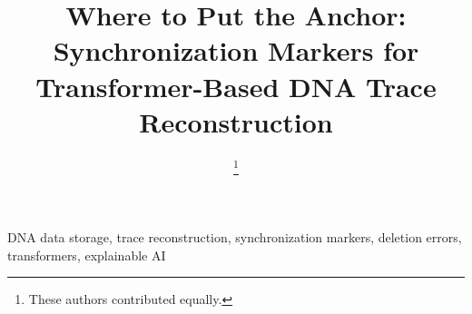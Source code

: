 \documentclass[conference]{IEEEtran}
\begin{document}
\setcounter{dbltopnumber}{3}\renewcommand{\dbltopfraction}{0.95}
\title{Where to Put the Anchor: Synchronization Markers for Transformer-Based DNA Trace Reconstruction}

\author{
\thanks{These authors contributed equally.}
}

\maketitle

\begin{abstract}

\end{abstract}

\begin{IEEEkeywords}
DNA data storage, trace reconstruction, synchronization markers, deletion errors, transformers, explainable AI
\end{IEEEkeywords}





\end{document}

